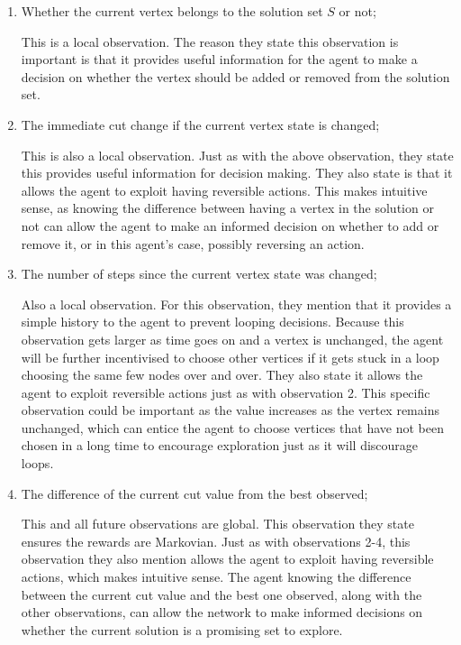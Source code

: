 \documentclass{article}
\begin{document}
\begin{enumerate}
    \item Whether the current vertex belongs to the solution set $S$ or not; 
    
    This is a local observation. The reason they state this observation is important is that it provides useful information for the agent to make a decision on whether the vertex should be added or removed from the solution set.

    \item The immediate cut change if the current vertex state is changed;
    
    This is also a local observation. Just as with the above observation, they state this provides useful information for decision making. They also state is that it allows the agent to exploit having reversible actions. This makes intuitive sense, as knowing the difference between having a vertex in the solution or not can allow the agent to make an informed decision on whether to add or remove it, or in this agent's case, possibly reversing an action. 

    \item The number of steps since the current vertex state was changed;
    
    Also a local observation. For this observation, they mention that it provides a simple history to the agent to prevent looping decisions. Because this observation gets larger as time goes on and a vertex is unchanged, the agent will be further incentivised to choose other vertices if it gets stuck in a loop choosing the same few nodes over and over. They also state it allows the agent to exploit reversible actions just as with observation 2. This specific observation could be important as the value increases as the vertex remains unchanged, which can entice the agent to choose vertices that have not been chosen in a long time to encourage exploration just as it will discourage loops.
    
    \item The difference of the current cut value from the best observed;
    
    This and all future observations are global. This observation they state ensures the rewards are Markovian. Just as with observations 2-4, this observation they also mention allows the agent to exploit having reversible actions, which makes intuitive sense. The agent knowing the difference between the current cut value and the best one observed, along with the other observations, can allow the network to make informed decisions on whether the current solution is a promising set to explore.


\end{enumerate}
\end{document}
